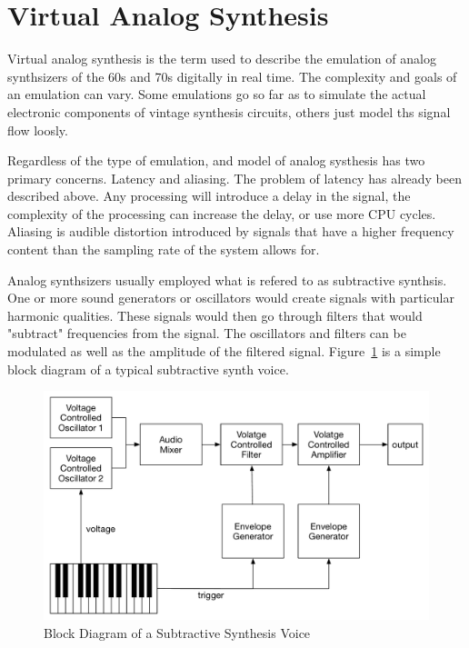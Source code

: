 \section{Virtual Analog Synthesis}

Virtual analog synthesis is the term used to describe the emulation of analog synthsizers of the 60s and 70s digitally in real time. The complexity and goals of an emulation can vary. Some emulations go so far as to simulate the actual electronic components of vintage synthesis circuits, others just model ths signal flow loosly.

Regardless of the type of emulation, and model of analog systhesis has two primary concerns. Latency and aliasing. The problem of latency has already been described above. Any processing will introduce a delay in the signal, the complexity of the processing can increase the delay, or use more CPU cycles. Aliasing is audible distortion introduced by signals that have a higher frequency content than the sampling rate of the system allows for.

Analog synthsizers usually employed what is refered to as subtractive synthsis. One or more sound generators or oscillators would create signals with particular harmonic qualities. These signals would then go through filters that would "subtract" frequencies from the signal. The oscillators and filters can be modulated as well as the amplitude of the filtered signal. Figure~\ref{fig:synth_voice_block} is a simple block diagram of a typical subtractive synth voice.

\begin{figure}[h]
    \centering
    \includegraphics[width=\textwidth]{assets/synth_voice_block.pdf}
    \caption{Block Diagram of a Subtractive Synthesis Voice}
    \label{fig:synth_voice_block}
\end{figure}

